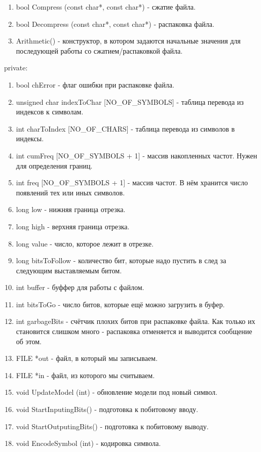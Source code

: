 \documentclass[12pt]{article}
\begin{document}
\begin{enumerate}
	\item bool Compress (const char*, const char*) - сжатие файла.
	\item bool Decompress (const char*, const char*) - распаковка файла.
	\item Arithmetic() - конструктор, в котором задаются начальные значения для последующей работы со сжатием/распаковкой файла.
\end{enumerate}
\noindent
private:

\begin{enumerate}
	\item bool chError - флаг ошибки при распаковке файла.
	\item unsigned char indexToChar [NO\_OF\_SYMBOLS] - таблица перевода из индексов к символам.
	\item int charToIndex [NO\_OF\_CHARS] - таблица перевода из символов в индексы.
	\item int cumFreq [NO\_OF\_SYMBOLS + 1] - массив накопленных частот. Нужен для определения границ.
	\item int freq [NO\_OF\_SYMBOLS + 1] - массив частот. В нём хранится число появлений тех или иных символов.
	\item long low - нижняя граница отрезка. 
	\item long high - верхняя граница отрезка.
	\item long value - число, которое лежит в отрезке.
	\item long bitsToFollow - количество бит, которые надо пустить в след за следующим выставляемым битом.
	\item int buffer - буффер для работы с файлом.
	\item int bitsToGo - число битов, которые ещё можно загрузить в буфер.
	\item int garbageBits - счётчик плохих битов при распаковке файла. Как только их становится слишком много - распаковка отменяется и выводится сообщение об этом.
	\item FILE *out - файл, в который мы записываем.
	\item FILE *in - файл, из которого мы считываем.
	\item void UpdateModel (int) - обновление модели под новый символ.
	\item void StartInputingBits() - подготовка к побитовому вводу.
	\item void StartOutputingBits() - подготовка к побитовому выводу.
	\item void EncodeSymbol (int) - кодировка символа.

\end{enumerate}
\end{document}
